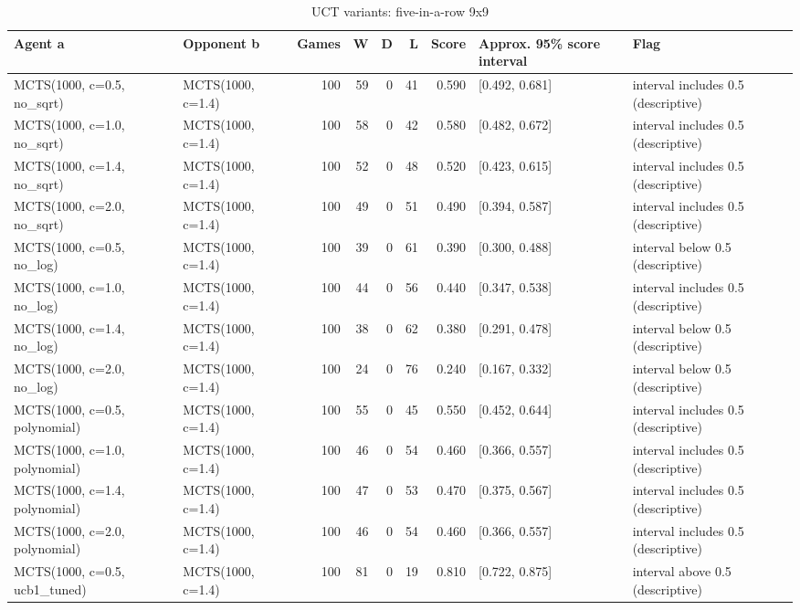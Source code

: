 \begin{table}[!t]
\centering
\caption{UCT variants: five-in-a-row 9x9}
\label{tab:formula_gomoku9}
\small
\begin{tabular}{llrrrrrll}
\toprule
Agent a & Opponent b & Games & W & D & L & Score & Approx. 95\% score interval & Flag \\
\midrule
MCTS(1000, c=0.5, no\_sqrt) & MCTS(1000, c=1.4) & 100 & 59 & 0 & 41 & 0.590 & [0.492, 0.681] & interval includes 0.5 (descriptive) \\
MCTS(1000, c=1.0, no\_sqrt) & MCTS(1000, c=1.4) & 100 & 58 & 0 & 42 & 0.580 & [0.482, 0.672] & interval includes 0.5 (descriptive) \\
MCTS(1000, c=1.4, no\_sqrt) & MCTS(1000, c=1.4) & 100 & 52 & 0 & 48 & 0.520 & [0.423, 0.615] & interval includes 0.5 (descriptive) \\
MCTS(1000, c=2.0, no\_sqrt) & MCTS(1000, c=1.4) & 100 & 49 & 0 & 51 & 0.490 & [0.394, 0.587] & interval includes 0.5 (descriptive) \\
MCTS(1000, c=0.5, no\_log) & MCTS(1000, c=1.4) & 100 & 39 & 0 & 61 & 0.390 & [0.300, 0.488] & interval below 0.5 (descriptive) \\
MCTS(1000, c=1.0, no\_log) & MCTS(1000, c=1.4) & 100 & 44 & 0 & 56 & 0.440 & [0.347, 0.538] & interval includes 0.5 (descriptive) \\
MCTS(1000, c=1.4, no\_log) & MCTS(1000, c=1.4) & 100 & 38 & 0 & 62 & 0.380 & [0.291, 0.478] & interval below 0.5 (descriptive) \\
MCTS(1000, c=2.0, no\_log) & MCTS(1000, c=1.4) & 100 & 24 & 0 & 76 & 0.240 & [0.167, 0.332] & interval below 0.5 (descriptive) \\
MCTS(1000, c=0.5, polynomial) & MCTS(1000, c=1.4) & 100 & 55 & 0 & 45 & 0.550 & [0.452, 0.644] & interval includes 0.5 (descriptive) \\
MCTS(1000, c=1.0, polynomial) & MCTS(1000, c=1.4) & 100 & 46 & 0 & 54 & 0.460 & [0.366, 0.557] & interval includes 0.5 (descriptive) \\
MCTS(1000, c=1.4, polynomial) & MCTS(1000, c=1.4) & 100 & 47 & 0 & 53 & 0.470 & [0.375, 0.567] & interval includes 0.5 (descriptive) \\
MCTS(1000, c=2.0, polynomial) & MCTS(1000, c=1.4) & 100 & 46 & 0 & 54 & 0.460 & [0.366, 0.557] & interval includes 0.5 (descriptive) \\
MCTS(1000, c=0.5, ucb1\_tuned) & MCTS(1000, c=1.4) & 100 & 81 & 0 & 19 & 0.810 & [0.722, 0.875] & interval above 0.5 (descriptive) \\

\end{tabular}
\end{table}
